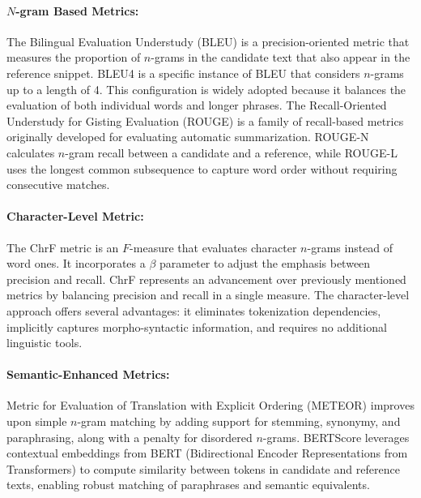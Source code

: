 \paragraph{\(N\)-gram Based Metrics:} The Bilingual Evaluation Understudy (BLEU) \parencite{papineni2002} is a precision-oriented metric that measures the proportion of \(n\)-grams in the candidate text that also appear in the reference snippet. BLEU4 is a specific instance of BLEU that considers \(n\)-grams up to a length of 4. This configuration is widely adopted because it balances the evaluation of both individual words and longer phrases. The Recall-Oriented Understudy for Gisting Evaluation (ROUGE) \parencite{lin2004} is a family of recall-based metrics originally developed for evaluating automatic summarization. ROUGE-N calculates \(n\)-gram recall between a candidate and a reference, while ROUGE-L uses the longest common subsequence to capture word order without requiring consecutive matches.

\begin{sloppypar}
\paragraph{Character-Level Metric:} The ChrF metric \parencite{popovic2015} is an \(F\)-measure that evaluates character \(n\)-grams instead of word ones. It incorporates a \(\beta\) parameter to adjust the emphasis between precision and recall. ChrF represents an advancement over previously mentioned metrics by balancing precision and recall in a single measure. The character-level approach offers several advantages: it eliminates tokenization dependencies, implicitly captures morpho-syntactic information, and requires no additional linguistic tools.
\end{sloppypar}

\paragraph{Semantic-Enhanced Metrics:} Metric for Evaluation of Translation with Explicit Ordering (METEOR) \parencite{banarjee2005} improves upon simple \(n\)-gram matching by adding support for stemming, synonymy, and paraphrasing, along with a penalty for disordered \(n\)-grams. BERTScore \parencite{zhang2019} leverages contextual embeddings from BERT (Bidirectional Encoder Representations from Transformers) to compute similarity between tokens in candidate and reference texts, enabling robust matching of paraphrases and semantic equivalents.

